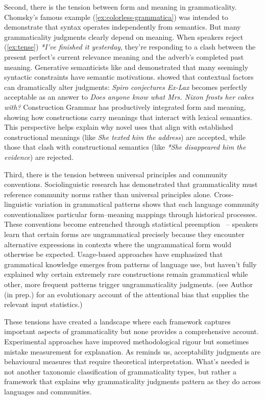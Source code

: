\documentclass[12pt,letterpaper]{article}
\begin{document}
Second, there is the tension between form and meaning in grammaticality. Chomsky's famous example (\ref{ex:colorless-grammatica}) was intended to demonstrate that syntax operates independently from semantics. But many grammaticality judgments clearly depend on meaning. When speakers reject (\ref{ex:tense}) \textit{*I've finished it yesterday}, they're responding to a clash between the present perfect's current relevance meaning and the adverb's completed past meaning. Generative semanticists like \textcite{lakoff1971} and \textcite{mccawley1968} demonstrated that many seemingly syntactic constraints have semantic motivations. \textcite{morgan1973} showed that contextual factors can dramatically alter judgments: \textit{Spiro conjectures Ex-Lax} becomes perfectly acceptable as an answer to \textit{Does anyone know what Mrs. Nixon frosts her cakes with?} Construction Grammar \autocite{goldberg1995constructions} has productively integrated form and meaning, showing how constructions carry meanings that interact with lexical semantics. This perspective helps explain why novel uses that align with established constructional meanings (like \textit{She texted him the address}) are accepted, while those that clash with constructional semantics (like \textit{*She disappeared him the evidence}) are rejected.

Third, there is the tension between universal principles and community conventions. Sociolinguistic research \autocite{labov1972} has demonstrated that grammaticality must reference community norms rather than universal principles alone. Cross-linguistic variation in grammatical patterns shows that each language community conventionalizes particular form--meaning mappings through historical processes. These conventions become entrenched through statistical preemption \autocite{Goldberg2011}~-- speakers learn that certain forms are ungrammatical precisely because they encounter alternative expressions in contexts where the ungrammatical form would otherwise be expected. Usage-based approaches \autocite{bybee2006} have emphasized that grammatical knowledge emerges from patterns of language use, but haven't fully explained why certain extremely rare constructions remain grammatical while other, more frequent patterns trigger ungrammaticality judgments. (see Author (in prep.) for an evolutionary account of the attentional bias that supplies the relevant input statistics.)

These tensions have created a landscape where each framework captures important aspects of grammaticality but none provides a comprehensive account. Experimental approaches have improved methodological rigour but sometimes mistake measurement for explanation. As \textcite{schutze2016} reminds us, acceptability judgments are behavioural measures that require theoretical interpretation. What's needed is not another taxonomic classification of grammaticality types, but rather a framework that explains why grammaticality judgments pattern as they do across languages and communities.
\end{document}
